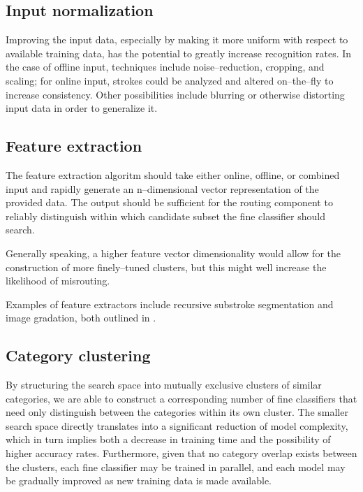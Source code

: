 \documentclass[10pt,conference,a4paper]{IEEEtran}
\begin{document}
	
	\subsection{Input normalization}

	Improving the input data, especially by making it more uniform with respect to available training data, has the potential
	to greatly increase recognition rates. In the case of offline input, techniques include noise--reduction,
	cropping, and scaling; for online input, strokes could be analyzed and altered on--the--fly to increase consistency.
	Other possibilities include blurring or otherwise distorting input data in order to generalize it. \cite{razzak2009combining}



	\subsection{Feature extraction}

	The feature extraction algoritm should take either online, offline, or combined input and rapidly generate
	an n--dimensional vector representation of the provided data. The output should be sufficient for the
	routing component to reliably distinguish within which candidate subset the fine classifier should search.

	Generally speaking, a higher feature vector dimensionality would allow for the construction of more finely--tuned clusters,
	but this might well increase the likelihood of misrouting.%

	Examples of feature extractors include recursive substroke segmentation and image gradation, both outlined in \cite{tanaka1999hybrid}.



	\subsection{Category clustering}

	By structuring the search space into mutually exclusive clusters of similar categories,
	we are able to construct a corresponding number of fine classifiers that need only distinguish
	between the categories within its own cluster. The smaller search space directly translates into a
	significant reduction of model complexity, which in turn implies both a decrease in training time
	and the possibility of higher accuracy rates. Furthermore, given that no category overlap exists
	between the clusters, each fine classifier may be trained in parallel, and each model may be gradually
	improved as new training data is made available.
\end{document}
